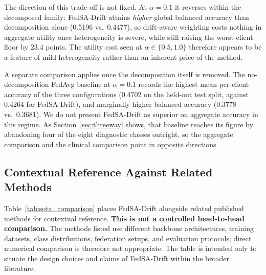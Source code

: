 \documentclass[utf8]{FrontiersinHarvard} %
\newcommand{\sadrift}{FedSA-Drift}
\begin{document}
The direction of this trade-off is not fixed. At $\alpha{=}0.1$ it reverses within the decomposed family: \sadrift{} attains \emph{higher} global balanced accuracy than decomposition alone (0.5196 vs.\ 0.4477), so drift-aware weighting costs nothing in aggregate utility once heterogeneity is severe, while still raising the worst-client floor by 23.4 points. The utility cost seen at $\alpha \in \{0.5, 1.0\}$ therefore appears to be a feature of mild heterogeneity rather than an inherent price of the method.

A separate comparison applies once the decomposition itself is removed. The no-decomposition FedAvg baseline at $\alpha{=}0.1$ records the highest mean per-client accuracy of the three configurations (0.4702 on the held-out test split, against 0.4264 for \sadrift{}), and marginally higher balanced accuracy (0.3778 vs.\ 0.3681). We do not present \sadrift{} as superior on aggregate accuracy in this regime. As Section~\ref{sec:threeway} shows, that baseline reaches its figure by abandoning four of the eight diagnostic classes outright, so the aggregate comparison and the clinical comparison point in opposite directions.

\subsection{Contextual Reference Against Related Methods}
\label{sec:sota_comparison}

Table~\ref{tab:sota_comparison} places \sadrift{} alongside related published methods for contextual reference. \textbf{This is not a controlled head-to-head comparison.} The methods listed use different backbone architectures, training datasets, class distributions, federation setups, and evaluation protocols; direct numerical comparison is therefore not appropriate. The table is intended only to situate the design choices and claims of \sadrift{} within the broader literature.
\end{document}

